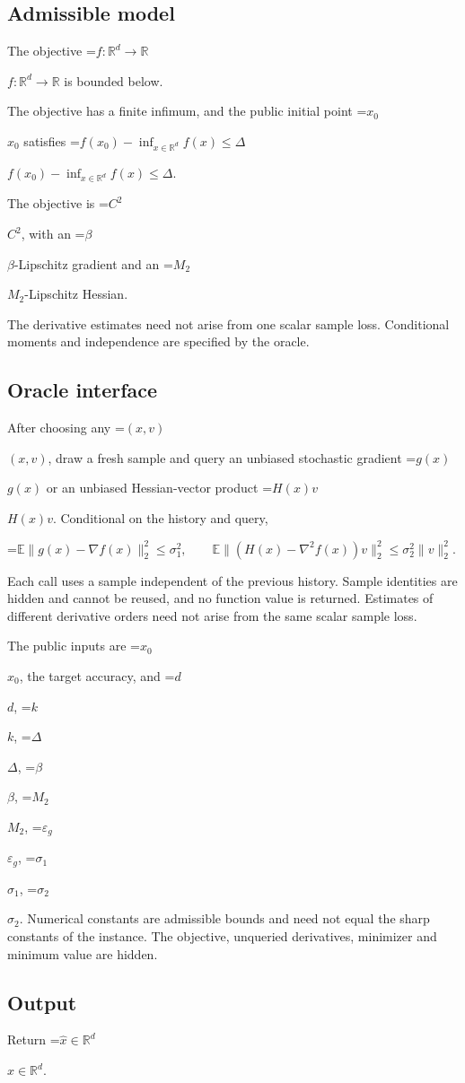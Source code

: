 \documentclass[10pt,a4paper]{article}
\newcommand{\AtlasMath}[1]{\par\begingroup\centering\setbox0=\hbox{$\displaystyle #1$}\ifdim\wd0>1.4\linewidth\typeout{ATLAS WIDE FORMULA: \the\wd0}\fi\ifdim\wd0>\linewidth\resizebox{\linewidth}{!}{\box0}\else\box0\fi\par\endgroup}
\newcommand{\AtlasInlineMath}[1]{\begingroup\setbox0=\hbox{$#1$}\ifdim\wd0>.4\linewidth\endgroup\AtlasMath{#1}\else\endgroup$#1$\fi}
\begin{document}
\subsection{Admissible model}
The objective \AtlasInlineMath{f:\mathbb{R}^d\to\mathbb{R}} is bounded below.

The objective has a finite infimum, and the public initial point \AtlasInlineMath{x_0} satisfies \AtlasInlineMath{f(x_0)-\inf_{x\in \mathbb{R}^d}f(x)\le\Delta}.

The objective is \AtlasInlineMath{C^2}, with an \AtlasInlineMath{\beta}-Lipschitz gradient and an \AtlasInlineMath{M_2}-Lipschitz Hessian.

The derivative estimates need not arise from one scalar sample loss. Conditional moments and independence are specified by the oracle.

\subsection{Oracle interface}
After choosing any \AtlasInlineMath{(x,v)}, draw a fresh sample and query an unbiased stochastic gradient \AtlasInlineMath{g(x)} or an unbiased Hessian-vector product \AtlasInlineMath{H(x)v}. Conditional on the history and query,


\AtlasMath{\mathbb{E}\|g(x)-\nabla f(x)\|_2^2\le\sigma_1^2,\qquad\mathbb{E}\|(H(x)-\nabla^2f(x))v\|_2^2\le\sigma_2^2\|v\|_2^2.}


Each call uses a sample independent of the previous history. Sample identities are hidden and cannot be reused, and no function value is returned. Estimates of different derivative orders need not arise from the same scalar sample loss.

The public inputs are \AtlasInlineMath{x_0}, the target accuracy, and \AtlasInlineMath{d}, \AtlasInlineMath{k}, \AtlasInlineMath{\Delta}, \AtlasInlineMath{\beta}, \AtlasInlineMath{M_2}, \AtlasInlineMath{\varepsilon_g}, \AtlasInlineMath{\sigma_1}, \AtlasInlineMath{\sigma_2}. Numerical constants are admissible bounds and need not equal the sharp constants of the instance. The objective, unqueried derivatives, minimizer and minimum value are hidden.

\subsection{Output}
Return \AtlasInlineMath{\widehat{x}\in \mathbb{R}^d}.
\end{document}

